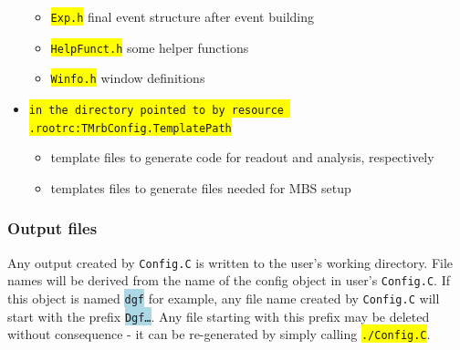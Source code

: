 \documentclass[10pt]{article}
\newcommand{\blue}[1]{\colorbox{lightblue}{\texttt{#1}}}
\newcommand{\yellow}[1]{\colorbox{yellow}{\texttt{#1}}}
\begin{document}
\begin{itemize}
\begin{itemize}
	\item	\yellow{Exp.h}
		final event structure after event building
	\item	\yellow{HelpFunct.h}
		some helper functions
	\item	\yellow{Winfo.h}
		window definitions
	\end{itemize}
\item	\yellow{in the directory pointed to by resource \texttt{.rootrc:TMrbConfig.TemplatePath}}
	\begin{itemize}
	\setlength{\rightmargin}{1em}%
	\setlength{\leftmargin}{2em}%
	\setlength{\itemsep}{0pt}%
	\setlength{\parskip}{1mm}%
	\setlength{\partopsep}{0pt}%
	\setlength{\parsep}{0pt}%
	\setlength{\topsep}{0pt}%
	\item	template files to generate code for readout and analysis, respectively
	\item	templates files to generate files needed for MBS setup
	\end{itemize}
\end{itemize}

\subsubsection{Output files}\vspace{3mm}

Any output created by \texttt{Config.C} is written to the user's working directory.
File names will be derived from the name of the config object in user's \texttt{Config.C}. If this object is
named \blue{dgf} for example, any file name created by \texttt{Config.C} will start with the prefix \blue{Dgf\dots{}}.
Any file starting with this prefix may be deleted without consequence - it can be re-generated by simply calling \yellow{./Config.C}.
\end{document}

